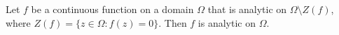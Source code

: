 
Let $f$ be a continuous function on a domain $\Omega$ that is analytic on $\Omega \setminus Z(f)$, where $Z(f) = \{z \in \Omega : f(z) = 0\}$. Then $f$ is analytic on $\Omega$.
